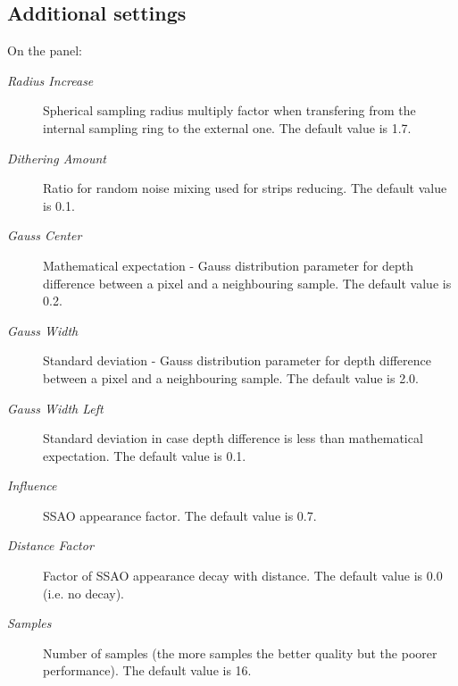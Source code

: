 \documentclass[a4paper,12pt,oneside]{sphinxmanual}
\begin{document}
\subsection{Additional settings}
\label{postprocessing_effects:id10}
On the  panel:
\begin{description}
\item[{\emph{Radius Increase}}] \leavevmode
Spherical sampling radius multiply factor when transfering from the internal sampling ring to the external one. The default value is 1.7.

\item[{\emph{Dithering Amount}}] \leavevmode
Ratio for random noise mixing used for strips reducing. The default value is 0.1.

\item[{\emph{Gauss Center}}] \leavevmode
Mathematical expectation - Gauss distribution parameter for depth difference between a pixel and a neighbouring sample. The default value is 0.2.

\item[{\emph{Gauss Width}}] \leavevmode
Standard deviation - Gauss distribution parameter for depth difference between a pixel and a neighbouring sample. The default value is 2.0.

\item[{\emph{Gauss Width Left}}] \leavevmode
Standard deviation in case depth difference is less than mathematical expectation. The default value is 0.1.

\item[{\emph{Influence}}] \leavevmode
SSAO appearance factor. The default value is 0.7.

\item[{\emph{Distance Factor}}] \leavevmode
Factor of SSAO appearance decay with distance. The default value is 0.0 (i.e. no decay).

\item[{\emph{Samples}}] \leavevmode
Number of samples (the more samples the better quality but the poorer performance). The default value is 16.

\end{description}
\end{document}
